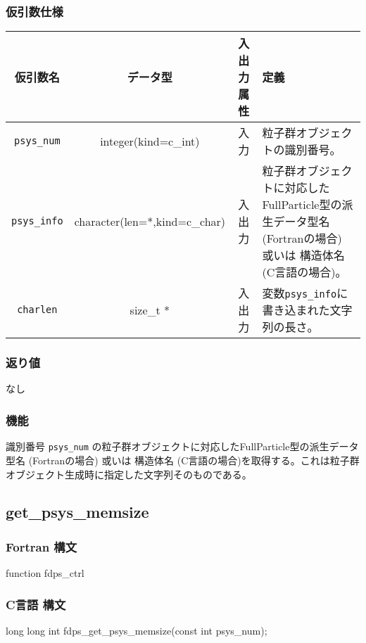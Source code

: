 \subsubsection*{仮引数仕様}
\begin{table}[h]
\begin{tabularx}{\linewidth}{cccX}
\toprule
\rowcolor{Snow2}
仮引数名 & データ型 & 入出力属性 & 定義 \\
\midrule
\texttt{psys\_num} & integer(kind=c\_int) & 入力 & 粒子群オブジェクトの識別番号。\\
\texttt{psys\_info} & character(len=*,kind=c\_char) & 入出力 & 粒子群オブジェクトに対応したFullParticle型の派生データ型名 {\small (Fortranの場合)} 或いは 構造体名 {\small (C言語の場合)}。\\
\texttt{charlen} & size\_t * & 入出力 & 変数\texttt{psys\_info}に書き込まれた文字列の長さ。 \\
\bottomrule
\end{tabularx}
\end{table}

\subsubsection*{返り値}
なし

\subsubsection*{機能}
識別番号 \texttt{psys\_num} の粒子群オブジェクトに対応したFullParticle型の派生データ型名 {\small (Fortranの場合)} 或いは 構造体名 {\small (C言語の場合)}を取得する。これは粒子群オブジェクト生成時に指定した文字列そのものである。

\clearpage

\subsection{get\_psys\_memsize}
\subsubsection*{Fortran 構文}
\begin{screen}
\begin{spverbatim}
function fdps_ctrl%
\end{spverbatim}
\end{screen}

\subsubsection*{C言語 構文}
\begin{screen}
\begin{spverbatim}
long long int fdps_get_psys_memsize(const int psys_num);
\end{spverbatim}
\end{screen}

